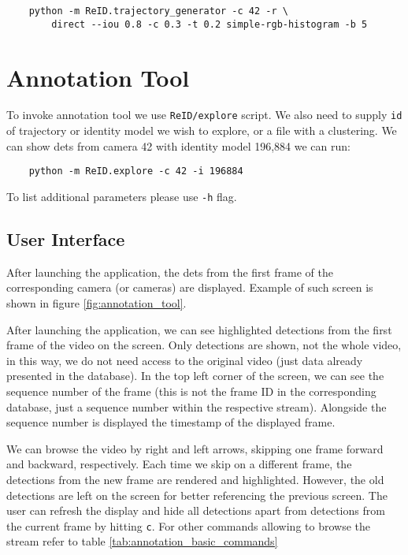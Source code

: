 \begin{verbatim}
    python -m ReID.trajectory_generator -c 42 -r \
        direct --iou 0.8 -c 0.3 -t 0.2 simple-rgb-histogram -b 5
\end{verbatim}


\section{Annotation Tool}

To invoke annotation tool we use \texttt{ReID/explore} script. We also need to supply \verb+id+ of trajectory or identity model we wish to explore, or a file with a clustering. We can show \glspl{det} from camera 42 with identity model 196,884 we can run:

\begin{verbatim}
    python -m ReID.explore -c 42 -i 196884
\end{verbatim}

To list additional parameters please use \verb+-h+ flag.

\subsection{User Interface}

After launching the application, the \glspl{det} from the first frame of the corresponding camera (or cameras) are displayed. Example of such screen is shown in figure \ref{fig:annotation_tool}.

After launching the application, we can see highlighted detections from
the first frame of the video on the screen.
Only detections are shown, not the whole video, in this way, we do not need access
to the original video (just data already presented in the database). In the top left corner
of the screen, we can see the sequence number of the frame (this is not the frame ID
in the corresponding database, just a sequence number within the respective stream). Alongside
the sequence number is displayed the timestamp of the displayed frame.

We can browse the video by right and left arrows, skipping one frame forward and
backward, respectively. Each time we skip on a different frame, the detections from
the new frame are rendered and highlighted. However, the old detections are left
on the screen for better referencing the previous screen. The user can refresh the display
and hide all detections apart from detections from the current frame by hitting \verb+c+.
For other commands allowing to browse the stream refer to table
\ref{tab:annotation_basic_commands}

